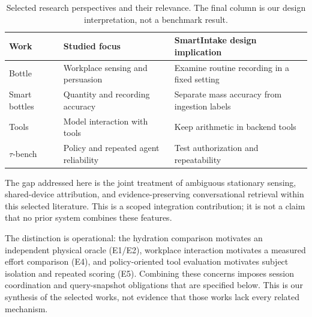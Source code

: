 \begin{table}[t]
\caption{Selected research perspectives and their relevance. The final column is our design interpretation, not a benchmark result.}\label{tab:related}
\centering\footnotesize\setlength{\tabcolsep}{4pt}
\begin{tabular}{@{}P{.19\columnwidth}P{.31\columnwidth}P{.42\columnwidth}@{}}\toprule
Work & Studied focus & SmartIntake design implication\\\midrule
Bottle~\cite{chiu2009} & Workplace sensing and persuasion & Examine routine recording in a fixed setting\\
Smart bottles~\cite{cohen2022} & Quantity and recording accuracy & Separate mass accuracy from ingestion labels\\
Tools~\cite{yao2023react,schick2023} & Model interaction with tools & Keep arithmetic in backend tools\\
$\tau$-bench~\cite{yao2024tau} & Policy and repeated agent reliability & Test authorization and repeatability\\\bottomrule
\end{tabular}
\end{table}

The gap addressed here is the joint treatment of ambiguous stationary sensing, shared-device attribution, and evidence-preserving conversational retrieval within this selected literature. This is a scoped integration contribution; it is not a claim that no prior system combines these features.

The distinction is operational: the hydration comparison motivates an independent physical oracle (E1/E2), workplace interaction motivates a measured effort comparison (E4), and policy-oriented tool evaluation motivates subject isolation and repeated scoring (E5). Combining these concerns imposes session coordination and query-snapshot obligations that are specified below. This is our synthesis of the selected works, not evidence that those works lack every related mechanism.
